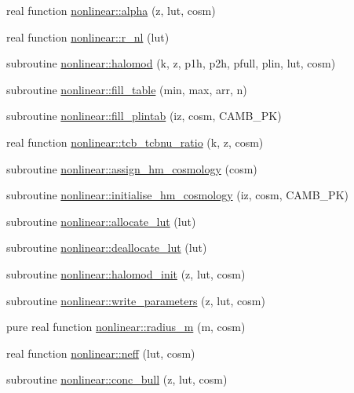 \begin{DoxyCompactItemize}
\item 
real function \mbox{\hyperlink{namespacenonlinear_a31039036014feacf6b5001228cbecf2d}{nonlinear\+::alpha}} (z, lut, cosm)
\item 
real function \mbox{\hyperlink{namespacenonlinear_a9fdd5c2093c44b1f49fdaafaa3e568da}{nonlinear\+::r\+\_\+nl}} (lut)
\item 
subroutine \mbox{\hyperlink{namespacenonlinear_a8b11cb79c822afc15ee5506a6b79e786}{nonlinear\+::halomod}} (k, z, p1h, p2h, pfull, plin, lut, cosm)
\item 
subroutine \mbox{\hyperlink{namespacenonlinear_a6ac027990c6d758a7c5420da7001dfc7}{nonlinear\+::fill\+\_\+table}} (min, max, arr, n)
\item 
subroutine \mbox{\hyperlink{namespacenonlinear_af44943bd607e88cf910383917ce03826}{nonlinear\+::fill\+\_\+plintab}} (iz, cosm, C\+A\+M\+B\+\_\+\+PK)
\item 
real function \mbox{\hyperlink{namespacenonlinear_a71f404d2d1de4ad126d2e43eea191621}{nonlinear\+::tcb\+\_\+tcbnu\+\_\+ratio}} (k, z, cosm)
\item 
subroutine \mbox{\hyperlink{namespacenonlinear_a44e107b52cde4df598539a1ed12f252a}{nonlinear\+::assign\+\_\+hm\+\_\+cosmology}} (cosm)
\item 
subroutine \mbox{\hyperlink{namespacenonlinear_a819e3b1efc1572f5e75eb5f2b415b4b4}{nonlinear\+::initialise\+\_\+hm\+\_\+cosmology}} (iz, cosm, C\+A\+M\+B\+\_\+\+PK)
\item 
subroutine \mbox{\hyperlink{namespacenonlinear_ac9ae18bd4ed466f0f8287e5c4757bec9}{nonlinear\+::allocate\+\_\+lut}} (lut)
\item 
subroutine \mbox{\hyperlink{namespacenonlinear_a9a42cb3acfe84c2c6ea9f085b357bdd1}{nonlinear\+::deallocate\+\_\+lut}} (lut)
\item 
subroutine \mbox{\hyperlink{namespacenonlinear_af025b4b6e2a711cea66352e50ea6de97}{nonlinear\+::halomod\+\_\+init}} (z, lut, cosm)
\item 
subroutine \mbox{\hyperlink{namespacenonlinear_abd2adda1e3c0e77617e1142893c4aa71}{nonlinear\+::write\+\_\+parameters}} (z, lut, cosm)
\item 
pure real function \mbox{\hyperlink{namespacenonlinear_af71d6d6d99de458db1a669744d7b1088}{nonlinear\+::radius\+\_\+m}} (m, cosm)
\item 
real function \mbox{\hyperlink{namespacenonlinear_a94503cd59bd5a206379a0c13afe89ffc}{nonlinear\+::neff}} (lut, cosm)
\item 
subroutine \mbox{\hyperlink{namespacenonlinear_a9559196d503174393cf74ce857984216}{nonlinear\+::conc\+\_\+bull}} (z, lut, cosm)

\end{DoxyCompactItemize}
